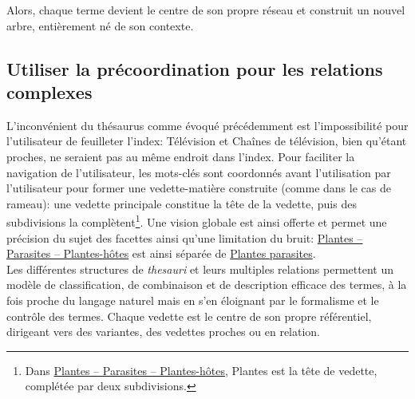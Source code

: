 Alors, chaque terme devient le centre de son propre réseau et construit un nouvel arbre, entièrement né de son contexte.


\subsection{\label{I-C-2-c}Utiliser la précoordination pour les relations complexes}

L'inconvénient du thésaurus comme évoqué précédemment est l'impossibilité pour l'utilisateur de feuilleter l'index: \og Télévision\fg{} et \og Chaînes de télévision\fg{}, bien qu'étant proches, ne seraient pas au même endroit dans l'index. Pour faciliter la navigation de l'utilisateur, les mots-clés sont coordonnés avant l'utilisation par l'utilisateur pour former une vedette-matière construite (comme dans le cas de \ac{rameau}): une vedette principale constitue la tête de la vedette, puis des subdivisions la complètent\footnote{Dans \og \href{https://data.bnf.fr/fr/11977461/plantes-hotes/}{Plantes -- Parasites -- Plantes-hôtes}\fg{}, \og Plantes\fg{} est la tête de vedette, complétée par deux subdivisions.}. Une vision globale est ainsi offerte et permet une précision du sujet des facettes ainsi qu'une limitation du bruit: \href{https://data.bnf.fr/fr/11977461/plantes-hotes/}{Plantes -- Parasites -- Plantes-hôtes}\fg{} est ainsi séparée de \href{https://data.bnf.fr/fr/12397201/plantes_parasites/}{\og Plantes parasites\fg{}}.\\

\bigskip
\bigskip
Les différentes structures de \textit{thesauri} et leurs multiples relations permettent un modèle de classification, de combinaison et de description efficace des termes, à la fois proche du langage naturel mais en s'en éloignant par le formalisme et le contrôle des termes. Chaque vedette est le centre de son propre référentiel, dirigeant vers des variantes, des vedettes proches ou en relation.

